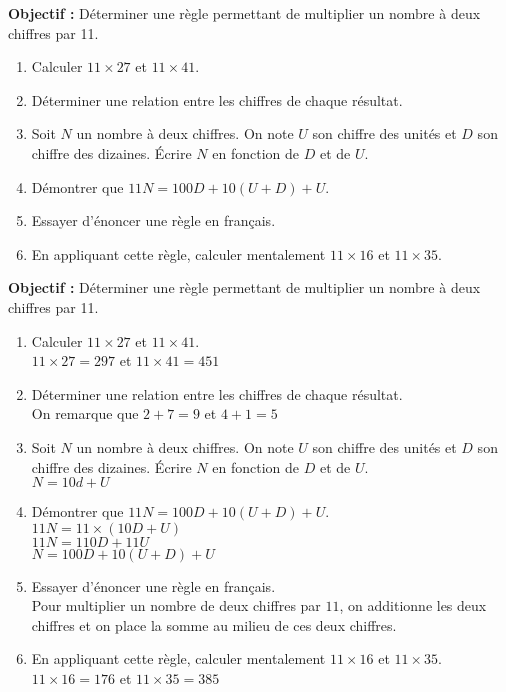 \begin{exercice*}
    {\bfseries Objectif :} Déterminer une règle permettant de multiplier un nombre à deux chiffres par \num{11}.
    \begin{enumerate}
        \item Calculer $11\times 27$ et $11\times 41$.
        \item Déterminer une relation entre les chiffres de chaque résultat.
        \item Soit $N$ un nombre à deux chiffres. On note $U$ son chiffre des unités et $D$ son chiffre des dizaines. Écrire $N$ en fonction de $D$ et de $U$.
        \item Démontrer que $11N = 100D + 10(U+D) + U$.
        \item Essayer d'énoncer une règle en français.
        \item En appliquant cette règle, calculer mentalement $11\times 16$ et $11\times 35$. 
    \end{enumerate}
\end{exercice*}
\begin{corrige}
    {\bfseries Objectif :} Déterminer une règle permettant de multiplier un nombre à deux chiffres par \num{11}.
    \begin{enumerate}
        \item Calculer $11\times 27$ et $11\times 41$.\\
        {\red $11\times 27 = 297$ et $11\times 41 = 451$}
        \item Déterminer une relation entre les chiffres de chaque résultat.\\
        {\red On remarque que $2+7=9$ et $4+1=5$}
        \item Soit $N$ un nombre à deux chiffres. On note $U$ son chiffre des unités et $D$ son chiffre des dizaines. Écrire $N$ en fonction de $D$ et de $U$.\\
        {\red $N=10d+U$}
        \item Démontrer que $11N = 100D + 10(U+D) + U$.\\
        {\red $11N=11\times (10D + U)$\\$11N=110D+11U$\\$N=100D + 10(U+D) + U$}        
        \item Essayer d'énoncer une règle en français.\\
        {\red Pour multiplier un nombre de deux chiffres par $11$, on additionne les deux chiffres et on place la somme au milieu de ces deux chiffres.}
        \item En appliquant cette règle, calculer mentalement $11\times 16$ et $11\times 35$.\\
        {\red $11\times 16 = 176$ et $11\times 35 = 385$}
    \end{enumerate}
\end{corrige}

